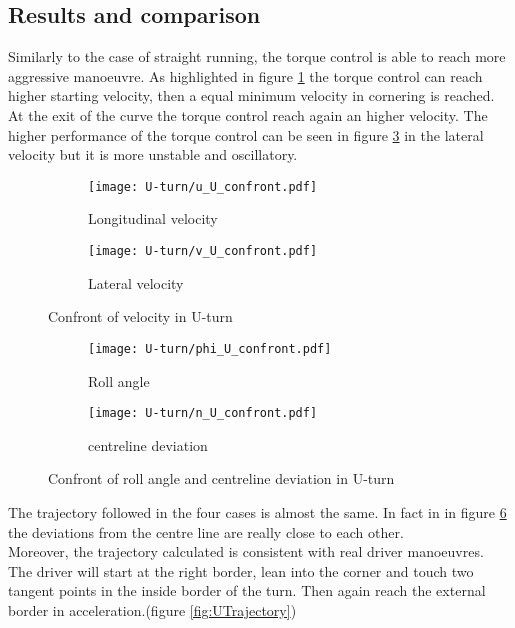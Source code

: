 \subsection{Results and comparison}
%
Similarly to the case of straight running, the torque control is able to reach more aggressive manoeuvre. As highlighted in figure \ref{fig:U1a} the torque control can reach higher starting velocity, then a equal minimum velocity in cornering is reached. At the exit of the curve the torque control reach again an higher velocity. The higher performance of the torque control can be seen in figure \ref{fig:U1b} in the lateral velocity but it is more unstable and oscillatory.\\
%
\begin{figure}[t]
    \begin{subfigure}{0.5\linewidth}
        \texttt{[image: U-turn/u\_U\_confront.pdf]}
        \caption{Longitudinal velocity}
        \label{fig:U1a}
    \end{subfigure}%
    \begin{subfigure}{0.5\linewidth}
        \texttt{[image: U-turn/v\_U\_confront.pdf]}
        \caption{Lateral velocity}
        \label{fig:U1b}
    \end{subfigure}
    \caption{Confront of velocity in U-turn}
\end{figure}
%
%
\begin{figure}[t]
    \begin{subfigure}{0.5\linewidth}
        \texttt{[image: U-turn/phi\_U\_confront.pdf]}
        \caption{Roll angle}
        \label{fig:U2a}
    \end{subfigure}%
    \begin{subfigure}{0.5\linewidth}
        \texttt{[image: U-turn/n\_U\_confront.pdf]}
        \caption{centreline deviation}
        \label{fig:U2b}
    \end{subfigure}
    \caption{Confront of roll angle and centreline deviation in U-turn}
\end{figure}
%
The trajectory followed in the four cases is almost the same. In fact in in figure \ref{fig:U2b} the deviations from the centre line are really close to each other.\\
Moreover, the trajectory calculated is consistent with real driver manoeuvres. The driver will  start at the right border, lean into the corner and touch two tangent points in the inside border of the turn. Then again reach the external border in acceleration.(figure \ref{fig:UTrajectory})\\
